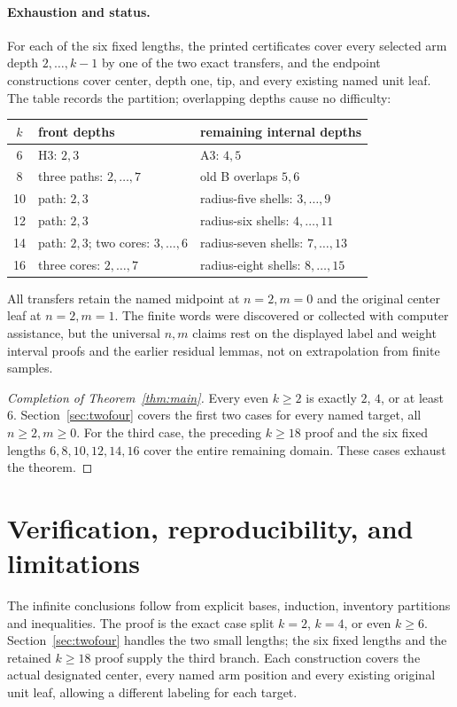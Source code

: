\documentclass[11pt,a4paper]{article}
\theoremstyle{definition}\newtheorem{definition}[theorem]{Definition}
\theoremstyle{remark}\newtheorem{remark}[theorem]{Remark}
\begin{document}
\paragraph{Exhaustion and status.}
For each of the six fixed lengths, the printed certificates cover
every selected arm depth $2,\ldots,k-1$ by one of the two exact
transfers, and the endpoint constructions cover center, depth one,
tip, and every existing named unit leaf. The table records the
partition; overlapping depths cause no difficulty:
\begin{center}\begin{tabular}{c p{48mm} p{52mm}}
\toprule
$k$ & front depths & remaining internal depths\\\midrule
6 & H3: $2,3$ & A3: $4,5$\\
8 & three paths: $2,\ldots,7$ & old B overlaps $5,6$\\
10 & path: $2,3$ & radius-five shells: $3,\ldots,9$\\
12 & path: $2,3$ & radius-six shells: $4,\ldots,11$\\
14 & path: $2,3$; two cores: $3,\ldots,6$ & radius-seven shells: $7,\ldots,13$\\
16 & three cores: $2,\ldots,7$ & radius-eight shells: $8,\ldots,15$\\
\bottomrule
\end{tabular}\end{center}
All transfers retain the named midpoint at $n=2,m=0$ and the original
center leaf at $n=2,m=1$. The finite words were discovered or collected
with computer assistance, but the universal $n,m$ claims rest on the
displayed label and weight interval proofs and the earlier residual
lemmas, not on extrapolation from finite samples.

\begin{proof}[Completion of Theorem~\ref{thm:main}]
Every even $k\ge2$ is exactly $2$, $4$, or at least $6$.
Section~\ref{sec:twofour} covers the first two cases for every named
target, all $n\ge2,m\ge0$. For the third case, the preceding
$k\ge18$ proof and the six fixed lengths $6,8,10,12,14,16$ cover
the entire remaining domain. These cases exhaust the theorem.
\end{proof}

\section{Verification, reproducibility, and limitations}
\label{sec:verification}
The infinite conclusions follow from explicit bases, induction,
inventory partitions and inequalities. The proof is the exact case
split $k=2$, $k=4$, or even $k\ge6$. Section~\ref{sec:twofour}
handles the two small lengths; the six fixed lengths and the retained
$k\ge18$ proof supply the third branch. Each construction covers the
actual designated center, every named arm position and every existing
original unit leaf, allowing a different labeling for each target.
\end{document}
